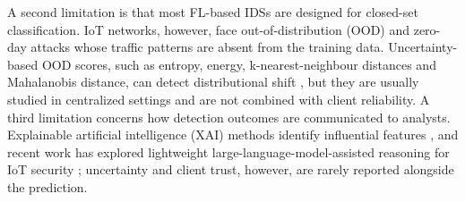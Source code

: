\documentclass[pdflatex,sn-mathphys-num]{sn-jnl}
\begin{document}
A second limitation is that most FL-based IDSs are designed for closed-set classification. IoT networks, however, face out-of-distribution (OOD) and zero-day attacks whose traffic patterns are absent from the training data. Uncertainty-based OOD scores, such as entropy, energy, k-nearest-neighbour distances and Mahalanobis distance, can detect distributional shift \cite{liu2020energy,wang2021tent,sun2022knn,lee2018mahalanobis}, but they are usually studied in centralized settings and are not combined with client reliability.  A third limitation concerns how detection outcomes are communicated to analysts. Explainable artificial intelligence (XAI) methods identify influential features \cite{alketbi2025comprehensive,alsbatin2025enhancing,amrullah2025review,menon2025ai,mohale2025systematic,hozouri2025comprehensive}, and recent work has explored lightweight large-language-model-assisted reasoning for IoT security \cite{mohawesh2026lightweight}; uncertainty and client trust, however, are rarely reported alongside the prediction.
\end{document}
